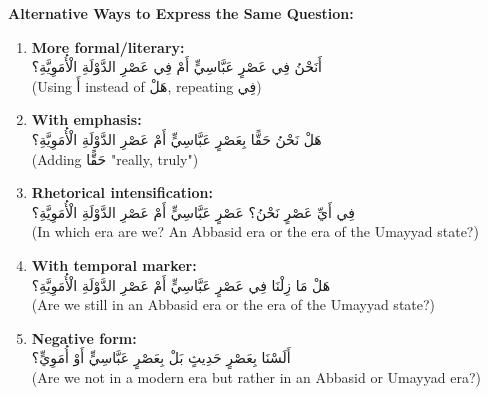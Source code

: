 \documentclass[letterpaper,12pt]{article}
\begin{document}
\begin{tcolorbox}[colback=boxcolor,colframe=headercolor,breakable]
\textbf{Alternative Ways to Express the Same Question:}

\begin{enumerate}
\item \textbf{More formal/literary:}\\
\textarabic{أَنَحْنُ فِي عَصْرٍ عَبَّاسِيٍّ أَمْ فِي عَصْرِ الدَّوْلَةِ الْأُمَوِيَّةِ؟}\\
(Using \textarabic{أَ} instead of \textarabic{هَلْ}, repeating \textarabic{فِي})

\item \textbf{With emphasis:}\\
\textarabic{هَلْ نَحْنُ حَقًّا بِعَصْرٍ عَبَّاسِيٍّ أَمْ عَصْرِ الدَّوْلَةِ الْأُمَوِيَّةِ؟}\\
(Adding \textarabic{حَقًّا} "really, truly")

\item \textbf{Rhetorical intensification:}\\
\textarabic{فِي أَيِّ عَصْرٍ نَحْنُ؟ عَصْرٍ عَبَّاسِيٍّ أَمْ عَصْرِ الدَّوْلَةِ الْأُمَوِيَّةِ؟}\\
(In which era are we? An Abbasid era or the era of the Umayyad state?)

\item \textbf{With temporal marker:}\\
\textarabic{هَلْ مَا زِلْنَا فِي عَصْرٍ عَبَّاسِيٍّ أَمْ عَصْرِ الدَّوْلَةِ الْأُمَوِيَّةِ؟}\\
(Are we still in an Abbasid era or the era of the Umayyad state?)

\item \textbf{Negative form:}\\
\textarabic{أَلَسْنَا بِعَصْرٍ حَدِيثٍ بَلْ بِعَصْرٍ عَبَّاسِيٍّ أَوْ أُمَوِيٍّ؟}\\
(Are we not in a modern era but rather in an Abbasid or Umayyad era?)
\end{enumerate}
\end{tcolorbox}

\end{document}
